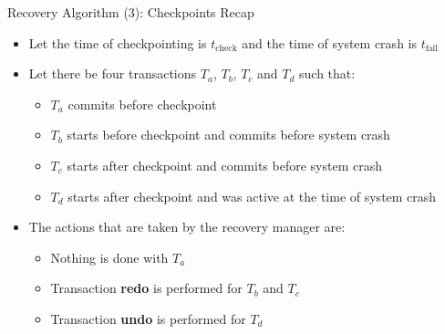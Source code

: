 \documentclass[aspectratio=169, xcolor=dvipsnames]{beamer}
\begin{document}
\begin{frame}{Recovery Algorithm (3): Checkpoints Recap}
    \begin{itemize}[<+->]
        \item Let the time of checkpointing is $t_{\text{check}}$ and the time of system crash is $t_{\text{fail}}$
        \item Let there be four transactions $T_a$, $T_b$, $T_c$ and $T_d$ such that:
        \begin{itemize}
            \item[$\triangleright$] $T_a$ commits before checkpoint
            \item[$\triangleright$] $T_b$ starts before checkpoint and commits before system crash
            \item[$\triangleright$] $T_c$ starts after checkpoint and commits before system crash
            \item[$\triangleright$] $T_d$ starts after checkpoint and was active at the time of system crash
        \end{itemize}
        \item The actions that are taken by the recovery manager are:
        \begin{itemize}
            \item[$\triangleright$] Nothing is done with $T_a$
            \item[$\triangleright$] Transaction \textbf{redo} is performed for $T_b$ and $T_c$
            \item[$\triangleright$] Transaction \textbf{undo} is performed for $T_d$
        \end{itemize}
    \end{itemize}
\end{frame}
\end{document}
